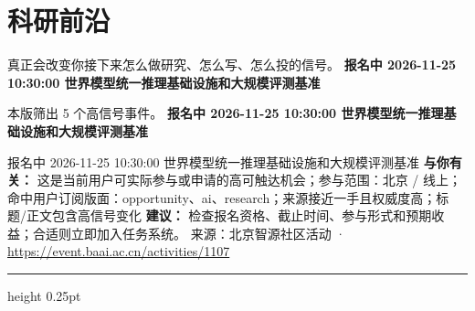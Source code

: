 \documentclass[10.5pt]{ctexart}
\begin{document}
\section*{科研前沿}
{\color{ormuted} 真正会改变你接下来怎么做研究、怎么写、怎么投的信号。}
\vspace{2mm}
{\LARGE\bfseries 报名中 2026-11-25 10:30:00 世界模型统一推理基础设施和大规模评测基准}\par
\vspace{1mm}
{\color{ormuted} 本版筛出 5 个高信号事件。}
\vspace{3mm}
{\Large\bfseries 报名中 2026-11-25 10:30:00 世界模型统一推理基础设施和大规模评测基准}\par
报名中 2026-11-25 10:30:00 世界模型统一推理基础设施和大规模评测基准
\textbf{与你有关：} 这是当前用户可实际参与或申请的高可触达机会；参与范围：北京 / 线上；命中用户订阅版面：opportunity、ai、research；来源接近一手且权威度高；标题/正文包含高信号变化
\textbf{建议：} 检查报名资格、截止时间、参与形式和预期收益；合适则立即加入任务系统。
{\footnotesize\color{ormuted} 来源：北京智源社区活动 · \url{https://event.baai.ac.cn/activities/1107}}
\vspace{4mm}
\hrule height 0.25pt
\vspace{3mm}
\end{document}
